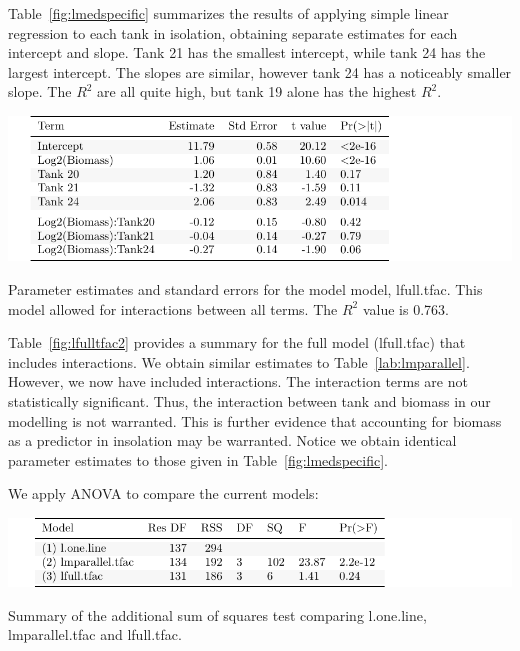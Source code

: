 Table~\ref{fig:lmedspecific} summarizes the results of applying simple linear regression to each tank in isolation, obtaining separate estimates for each intercept and slope. Tank 21 has the smallest intercept, while tank 24 has the largest intercept. The slopes are similar, however tank 24 has a noticeably smaller slope. The $R^{2}$ are all quite high, but tank 19 alone has the highest $R^{2}$. 



   \vspace{12pt}



\begin{table}[H]
\includegraphics{Chapter3Images/lfulltfac.pdf}
\caption{\hspace{1mm}Parameter estimates and standard errors for the model model, lfull.tfac. This model allowed for interactions between all terms. The $R^{2}$ value is 0.763.}
\label{fig:lfulltfac2}
\end{table}

Table~\ref{fig:lfulltfac2} provides a summary for the full model (lfull.tfac) that includes interactions. We obtain similar estimates to Table~\ref{lab:lmparallel}. However, we now have included interactions. The interaction terms are not statistically significant.  Thus, the interaction between tank and biomass in our modelling is not warranted. This is further evidence that accounting for biomass as a predictor in insolation may be warranted. Notice we obtain identical parameter estimates to those given in Table~\ref{fig:lmedspecific}.

\newpage

We apply ANOVA to compare the current models:

   \vspace{12pt}
 


\begin{table}[H]
\includegraphics{Chapter3Images/anova1.pdf}
\caption{\hspace{1mm}Summary of the additional sum of squares test comparing l.one.line,  lmparallel.tfac and lfull.tfac.}
\label{fig:anovacompare2}
\end{table}


